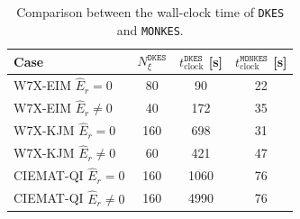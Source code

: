 \documentclass[10pt]{iopart}
\newcommand{\MONKES}{{\texttt{MONKES}}}
\newcommand{\DKES}{{\texttt{DKES}}}
\begin{document}
%
\begin{table}[h]
	\centering
	\begin{tabular}{lccc}
		\toprule
		Case   & $N_\xi^{\DKES}$ & $t_{\text{clock}}^{\DKES}$  [s] & $t_{\text{clock}}^{\MONKES}$  {[}s{]} \\ \midrule
		W7X-EIM $\widehat{E}_r=0$                                   & 80          &  90      &         22      \\
		W7X-EIM $\widehat{E}_r\ne 0$                                & {40}          &  {172}     &         35      \\ 
		W7X-KJM $\widehat{E}_r=0$                                   & 160         &  698     &         31      \\
		W7X-KJM $\widehat{E}_r\ne 0$                                & 60          &  421     &         47      \\
		CIEMAT-QI $\widehat{E}_r=0$                                 & 160         &  1060    &         76      \\
		CIEMAT-QI $\widehat{E}_r\ne 0$                              & 160         &  4990    &         76                    \\\bottomrule
	\end{tabular}
	\caption{Comparison between the wall-clock time of {\DKES} and {\MONKES}.}
	\label{tab:DKES_MONKES_Comparison}
\end{table}
\end{document}
